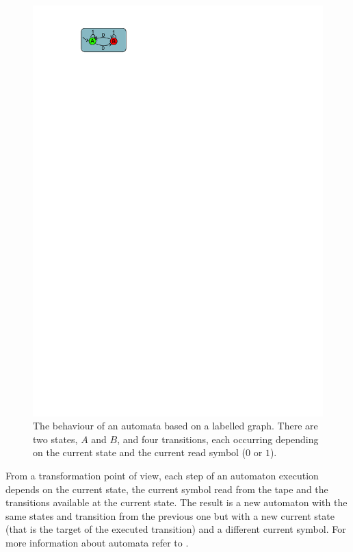 \begin{figure}[h]
\begin{center}
  \includegraphics[scale=1, trim=3.2cm 26.1cm 14.1cm 1.3cm,
  clip]{imgs/automaton_behaviour_example.pdf}
  \caption{The behaviour of an automata based on a labelled graph. There are two states, $A$ and $B$, and four transitions, each occurring depending on the current state and the current read symbol ($0$ or $1$).}
  \label{fig:automaton_behaviour_example}
\end{center}
\end{figure}

From a transformation point of view, each step of an automaton execution depends on the current state, the current symbol read from the tape and the transitions available at the current state. The result is a new automaton with the same states and transition from the previous one but with a new current state (that is the target of the executed transition) and a different current symbol. For more information about automata refer to 
\cite{intro_computational_theory}.

